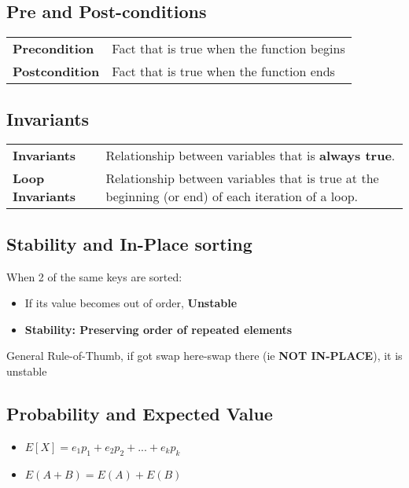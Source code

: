 \documentclass{article}
\begin{document}
    \subsection{Pre and Post-conditions}

    \begin{table}[htbp]
        \begin{tabular}{ll}
            \textbf{Precondition} & Fact that is true when the function begins\\
            \textbf{Postcondition} & Fact that is true when the function ends\\
        \end{tabular}
    \end{table}

    \subsection{Invariants}
        \begin{tabular}{ll}
            \textbf{Invariants} & Relationship between variables that is \textbf{always true}.\\
            \textbf{Loop Invariants} & Relationship between variables that is true at the beginning (or end) of each iteration of a loop.\\
        \end{tabular}


    \subsection{Stability and In-Place sorting}
    When 2 of the same keys are sorted:
    \begin{itemize}
        \item If its value becomes out of order, \textbf{Unstable}
        \item \textbf{Stability: Preserving order of repeated elements}
    \end{itemize}

    General Rule-of-Thumb, if got swap here-swap there (ie \textbf{NOT IN-PLACE}), it is unstable

    \subsection{Probability and Expected Value}

    
    \begin{itemize}
        \item $E[X] = e_{1}p_{1} + e_{2}p_{2} + ... + e_{k}p_{k}$
        \item $E(A+B) = E(A) + E(B)$
    \end{itemize}
\end{document}
